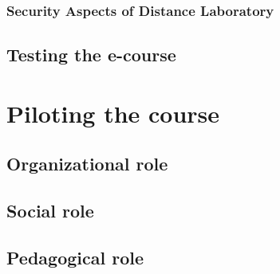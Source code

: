 \subsubsection{Security Aspects of Distance Laboratory}

\subsection{Testing the e-course}

\section{Piloting the course}

\subsection{Organizational role}

\subsection{Social role}

\subsection{Pedagogical role}
